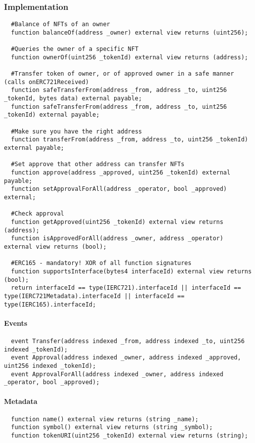 \subsubsection{Implementation}
\begin{lstlisting}
  #Balance of NFTs of an owner
  function balanceOf(address _owner) external view returns (uint256);

  #Queries the owner of a specific NFT
  function ownerOf(uint256 _tokenId) external view returns (address);

  #Transfer token of owner, or of approved owner in a safe manner (calls onERC721Received)
  function safeTransferFrom(address _from, address _to, uint256 _tokenId, bytes data) external payable;
  function safeTransferFrom(address _from, address _to, uint256 _tokenId) external payable;

  #Make sure you have the right address
  function transferFrom(address _from, address _to, uint256 _tokenId) external payable;

  #Set approve that other address can transfer NFTs
  function approve(address _approved, uint256 _tokenId) external payable;
  function setApprovalForAll(address _operator, bool _approved) external;

  #Check approval
  function getApproved(uint256 _tokenId) external view returns (address);
  function isApprovedForAll(address _owner, address _operator) external view returns (bool);

  #ERC165 - mandatory! XOR of all function signatures
  function supportsInterface(bytes4 interfaceId) external view returns (bool);
  return interfaceId == type(IERC721).interfaceId || interfaceId == type(IERC721Metadata).interfaceId || interfaceId == type(IERC165).interfaceId;
\end{lstlisting}

\paragraph{Events}
\begin{lstlisting}
  event Transfer(address indexed _from, address indexed _to, uint256 indexed _tokenId);
  event Approval(address indexed _owner, address indexed _approved, uint256 indexed _tokenId);
  event ApprovalForAll(address indexed _owner, address indexed _operator, bool _approved);
\end{lstlisting}
\paragraph{Metadata}
\begin{lstlisting}
  function name() external view returns (string _name);
  function symbol() external view returns (string _symbol);
  function tokenURI(uint256 _tokenId) external view returns (string);
\end{lstlisting}

